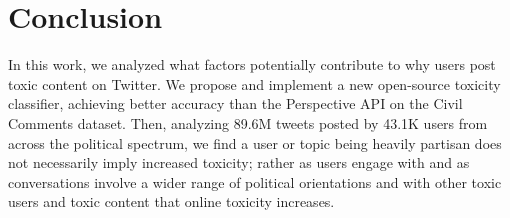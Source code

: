 \section{Conclusion}
In this work, we analyzed what factors potentially contribute to 
why users post toxic content on Twitter. We propose and implement a new open-source toxicity classifier, achieving better accuracy than the Perspective API on the Civil Comments dataset.  Then, analyzing 89.6M tweets posted by 43.1K users from across the political spectrum, we find a user or topic being heavily partisan does not necessarily imply increased toxicity; rather as users engage with and as conversations involve a wider range of political orientations and with other toxic users and toxic content that online toxicity increases.